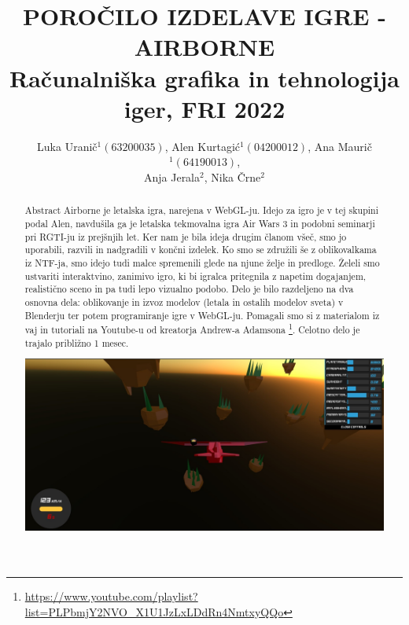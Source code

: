 \documentclass[a4paper]{article}
\begin{document}
\title{POROČILO IZDELAVE IGRE - AIRBORNE \\
 Računalniška grafika in tehnologija iger, FRI 2022}

\author{Luka Uranič$^{1} (63200035)$, Alen Kurtagić$^{1} (04200012)$,  Ana Maurič$^{1} (64190013)$, \\ Anja Jerala$^{2}$,  Nika Črne$^{2}$} %



\maketitle


\begin{abstract}{Abstract}%
Airborne je letalska igra, narejena v WebGL-ju. Idejo za igro je v tej skupini podal Alen, navdušila ga je letalska tekmovalna igra Air Wars 3 in podobni seminarji pri RGTI-ju iz prejšnjih let. Ker nam je bila ideja drugim članom všeč, smo jo uporabili, razvili in nadgradili v končni izdelek. Ko smo se združili še z oblikovalkama iz NTF-ja, smo idejo tudi malce spremenili glede na njune želje in predloge. Želeli smo ustvariti interaktvino, zanimivo igro, ki bi igralca pritegnila z napetim dogajanjem, realistično sceno in pa tudi lepo vizualno podobo. Delo je bilo razdeljeno na dva osnovna dela: oblikovanje in izvoz modelov (letala in ostalih modelov sveta) v Blenderju ter potem programiranje igre v WebGL-ju. Pomagali smo si z materialom iz vaj in tutoriali na Youtube-u od kreatorja Andrew-a Adamsona \footnote{\url{https://www.youtube.com/playlist?list=PLPbmjY2NVO_X1U1JzLxLDdRn4NmtxyQQo}}. Celotno delo je trajalo približno 1 mesec. 
\begin{center}
     \includegraphics[width=\columnwidth]{igra.jpg}
\end{center}
\end{abstract}
\end{document}
